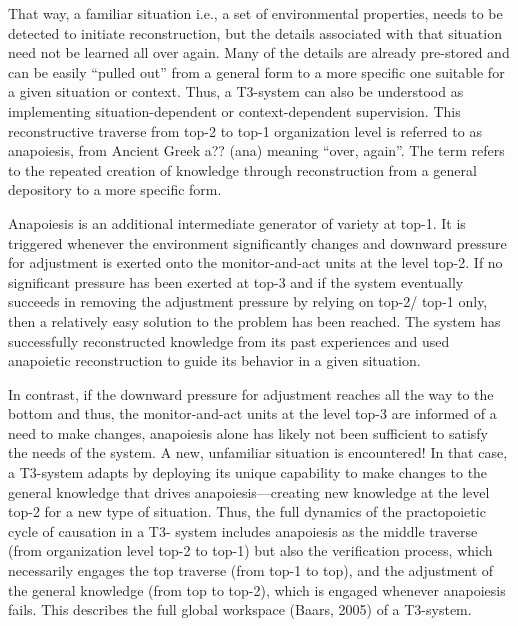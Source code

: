 \documentclass[10pt,a4paper]{article}
\begin{document}
That way, a familiar situation i.e., a set of environmental properties,
needs to be detected to initiate reconstruction, but the details
associated with that situation need not be learned all over again. Many
of the details are already pre-stored and can be easily “pulled out” from
a general form to a more specific one suitable for a given situation or
context. Thus, a T3-system can also be understood as implementing
situation-dependent or context-dependent supervision.
This reconstructive traverse from top-2 to top-1 organization
level is referred to as anapoiesis, from Ancient Greek a?? (ana)
meaning “over, again”. The term refers to the repeated creation of
knowledge through reconstruction from a general depository to a
more specific form.

Anapoiesis is an additional intermediate generator of variety at
top-1. It is triggered whenever the environment significantly
changes and downward pressure for adjustment is exerted onto
the monitor-and-act units at the level top-2. If no significant
pressure has been exerted at top-3 and if the system eventually
succeeds in removing the adjustment pressure by relying on top-2/
top-1 only, then a relatively easy solution to the problem has been
reached. The system has successfully reconstructed knowledge
from its past experiences and used anapoietic reconstruction to
guide its behavior in a given situation.


In contrast, if the downward pressure for adjustment reaches
all the way to the bottom and thus, the monitor-and-act units at
the level top-3 are informed of a need to make changes, anapoiesis
alone has likely not been sufficient to satisfy the needs of the
system. A new, unfamiliar situation is encountered! In that case, a
T3-system adapts by deploying its unique capability to make
changes to the general knowledge that drives anapoiesis—creating
new knowledge at the level top-2 for a new type of situation. Thus,
the full dynamics of the practopoietic cycle of causation in a T3-
system includes anapoiesis as the middle traverse (from organization
level top-2 to top-1) but also the verification process, which
necessarily engages the top traverse (from top-1 to top), and the
adjustment of the general knowledge  (from top to top-2), which is engaged whenever anapoiesis fails. This describes the full global
workspace (Baars, 2005) of a T3-system.
\end{document}
